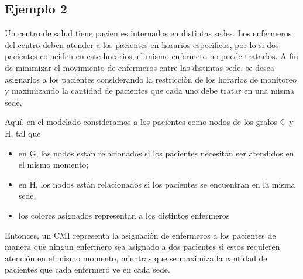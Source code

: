 \subsection{Ejemplo 2}
Un centro de salud tiene pacientes internados en distintas sedes.
Los enfermeros del centro deben atender a los pacientes en horarios espec\'ificos, por lo si dos pacientes coinciden en este horarios, el mismo enfermero no puede tratarlos.
A fin de minimizar el movimiento de enfermeros entre las distintas sede, se desea asignarlos a los pacientes considerando la restricci\'on de los horarios de monitoreo y maximizando la cantidad de pacientes que cada uno debe tratar en una misma sede.

Aqu\'i, en el modelado consideramos a los pacientes como nodos de los grafos G y H, tal que 
\begin{itemize}
	\item en G, los nodos est\'an relacionados si los pacientes necesitan ser atendidos en el mismo momento;
	\item en H, los nodos est\'an relacionados si los pacientes se encuentran en la misma sede.  
	\item los colores asignados representan a los distintos enfermeros
\end{itemize}
Entonces, un CMI representa la asignaci\'on de enfermeros a los pacientes de manera que ningun enfermero sea asignado a dos pacientes si estos requieren atenci\'on en el mismo momento, mientras que se maximiza la cantidad de pacientes que cada enfermero ve en cada sede. 
